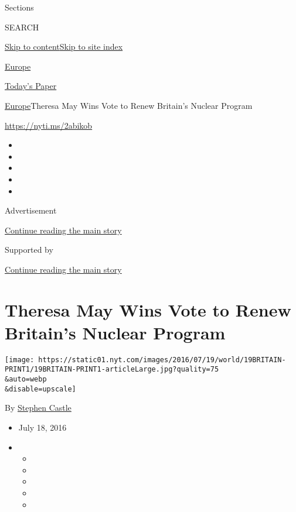Sections

SEARCH

\protect\hyperlink{site-content}{Skip to
content}\protect\hyperlink{site-index}{Skip to site index}

\href{https://www.nytimes.com/section/world/europe}{Europe}

\href{https://myaccount.nytimes.com/auth/login?response_type=cookie\&client_id=vi}{}

\href{https://www.nytimes.com/section/todayspaper}{Today's Paper}

\href{/section/world/europe}{Europe}\textbar{}Theresa May Wins Vote to
Renew Britain's Nuclear Program

\url{https://nyti.ms/2abikob}

\begin{itemize}
\item
\item
\item
\item
\item
\end{itemize}

Advertisement

\protect\hyperlink{after-top}{Continue reading the main story}

Supported by

\protect\hyperlink{after-sponsor}{Continue reading the main story}

\hypertarget{theresa-may-wins-vote-to-renew-britains-nuclear-program}{%
\section{Theresa May Wins Vote to Renew Britain's Nuclear
Program}\label{theresa-may-wins-vote-to-renew-britains-nuclear-program}}

\texttt{[image: https://static01.nyt.com/images/2016/07/19/world/19BRITAIN-PRINT1/19BRITAIN-PRINT1-articleLarge.jpg?quality=75\\\&auto=webp\\\&disable=upscale]}

By \href{http://www.nytimes.com/by/stephen-castle}{Stephen Castle}

\begin{itemize}
\item
  July 18, 2016
\item
  \begin{itemize}
  \item
  \item
  \item
  \item
  \item
  \end{itemize}
\end{itemize}

